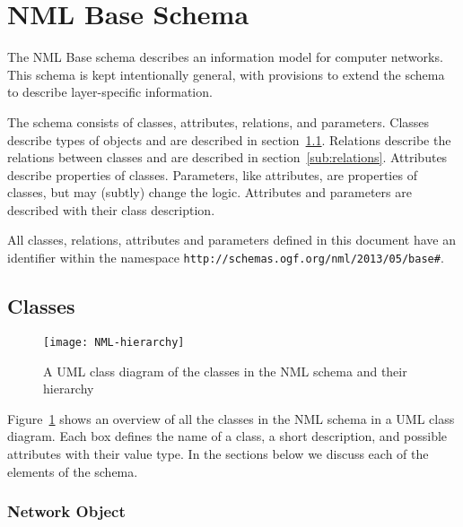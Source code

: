 
\section{NML Base Schema}%
\label{s:schema}

The NML Base schema describes an information model for computer networks. 
This schema is kept intentionally general, with provisions to extend the schema to 
describe layer-specific information.

The schema consists of classes, attributes, relations, and parameters. %
Classes describe types of objects and are described in section~\ref{sub:classes}. 
Relations describe the relations between classes and are described in section~\ref{sub:relations}. 
Attributes describe properties of classes.
Parameters, like attributes, are properties of classes, but may (subtly) change the logic.
Attributes and parameters are described with their class description.

All classes, relations, attributes and parameters defined in this document have an 
identifier within the namespace \texttt{http://schemas.ogf.org/nml/2013/05/base\#}.

\subsection{Classes}%
\label{sub:classes}

\begin{figure}[!b]
    \centering
        \texttt{[image: NML-hierarchy]}
    \caption{A UML class diagram of the classes in the NML schema and their hierarchy}
    \label{fig:NML-schema}
\end{figure}

Figure~\ref{fig:NML-schema} shows an overview of all the classes in the NML schema in a UML class diagram. Each box defines the name of a class, a short description, and possible attributes with their value type.
In the sections below we discuss each of the elements of the schema.

\subsubsection{Network Object}%
\label{class:network_object}

